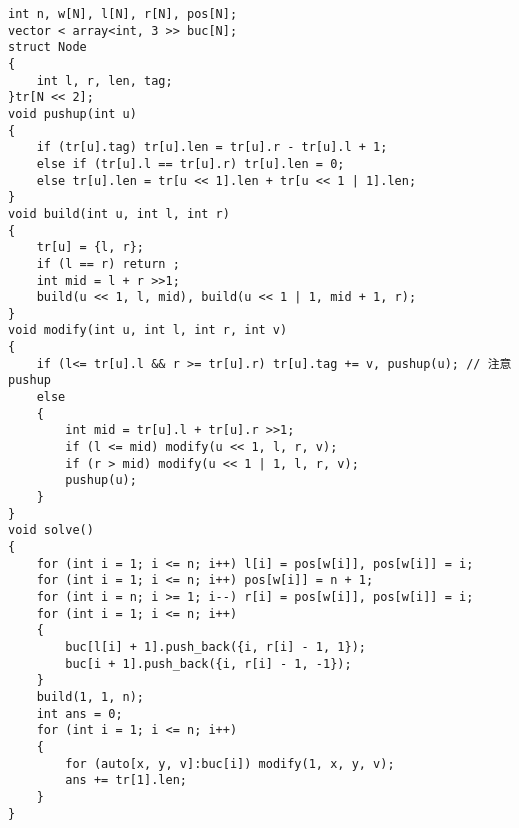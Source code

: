 \documentclass[a4paper, fontset=none]{ctexart}
\begin{document}
\begin{verbatim}
int n, w[N], l[N], r[N], pos[N];
vector < array<int, 3 >> buc[N];
struct Node
{
    int l, r, len, tag;
}tr[N << 2];
void pushup(int u)
{
    if (tr[u].tag) tr[u].len = tr[u].r - tr[u].l + 1;
    else if (tr[u].l == tr[u].r) tr[u].len = 0;
    else tr[u].len = tr[u << 1].len + tr[u << 1 | 1].len;
}
void build(int u, int l, int r)
{
    tr[u] = {l, r};
    if (l == r) return ;
    int mid = l + r >>1;
    build(u << 1, l, mid), build(u << 1 | 1, mid + 1, r);
}
void modify(int u, int l, int r, int v)
{
    if (l<= tr[u].l && r >= tr[u].r) tr[u].tag += v, pushup(u); // 注意 pushup
    else
    {
        int mid = tr[u].l + tr[u].r >>1;
        if (l <= mid) modify(u << 1, l, r, v);
        if (r > mid) modify(u << 1 | 1, l, r, v);
        pushup(u);
    }
}
void solve()
{
    for (int i = 1; i <= n; i++) l[i] = pos[w[i]], pos[w[i]] = i;
    for (int i = 1; i <= n; i++) pos[w[i]] = n + 1;
    for (int i = n; i >= 1; i--) r[i] = pos[w[i]], pos[w[i]] = i;
    for (int i = 1; i <= n; i++)
    {
        buc[l[i] + 1].push_back({i, r[i] - 1, 1});
        buc[i + 1].push_back({i, r[i] - 1, -1});
    }
    build(1, 1, n);
    int ans = 0;
    for (int i = 1; i <= n; i++)
    {
        for (auto[x, y, v]:buc[i]) modify(1, x, y, v);
        ans += tr[1].len;
    }
}
\end{verbatim}
\end{document}
